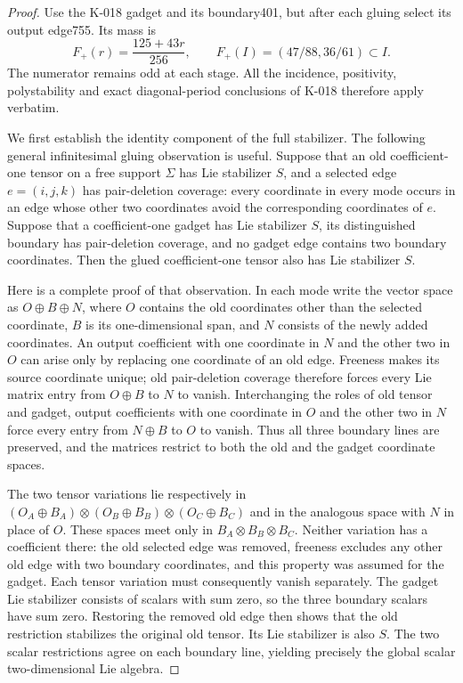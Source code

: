 \begin{proof}
Use the K-018 gadget and its boundary401, but after each gluing
select its output edge755.  Its mass is
\[
        F_+(r)=\frac{125+43r}{256},\qquad
        F_+(I)=(47/88,36/61)\subset I.
                                                               \tag{K-020a}
\]
The numerator remains odd at each stage.  All the incidence,
positivity, polystability and exact diagonal-period conclusions
of K-018 therefore apply verbatim.

We first establish the identity component of the full stabilizer.
The following general infinitesimal gluing observation is useful.
Suppose that an old coefficient-one tensor on a free support
$\Sigma$ has Lie stabilizer $S$, and a selected edge $e=(i,j,k)$
has pair-deletion coverage: every coordinate in every mode occurs
in an edge whose other two coordinates avoid the corresponding
coordinates of $e$.  Suppose that a coefficient-one gadget has
Lie stabilizer $S$, its distinguished boundary has pair-deletion
coverage, and no gadget edge contains two boundary coordinates.
Then the glued coefficient-one tensor also has Lie stabilizer $S$.

Here is a complete proof of that observation.  In each mode write
the vector space as $O\oplus B\oplus N$, where $O$ contains the
old coordinates other than the selected coordinate, $B$ is its
one-dimensional span, and $N$ consists of the newly added
coordinates.  An output coefficient with one coordinate in $N$
and the other two in $O$ can arise only by replacing one
coordinate of an old edge.  Freeness makes its source coordinate
unique; old pair-deletion coverage therefore forces every Lie
matrix entry from $O\oplus B$ to $N$ to vanish.  Interchanging
the roles of old tensor and gadget, output coefficients with
one coordinate in $O$ and the other two in $N$ force every entry
from $N\oplus B$ to $O$ to vanish.  Thus all three boundary lines
are preserved, and the matrices restrict to both the old and
the gadget coordinate spaces.

The two tensor variations lie respectively in
$(O_A\oplus B_A)\otimes(O_B\oplus B_B)\otimes(O_C\oplus B_C)$
and in the analogous space with $N$ in place of $O$.  These
spaces meet only in $B_A\otimes B_B\otimes B_C$.  Neither variation
has a coefficient there: the old selected edge was removed,
freeness excludes any other old edge with two boundary coordinates,
and this property was assumed for the gadget.  Each tensor
variation must consequently vanish separately.  The gadget Lie
stabilizer consists of scalars with sum zero, so the three
boundary scalars have sum zero.  Restoring the removed old edge
then shows that the old restriction stabilizes the original old
tensor.  Its Lie stabilizer is also $S$.  The two scalar
restrictions agree on each boundary line, yielding precisely
the global scalar two-dimensional Lie algebra.


\end{proof}
